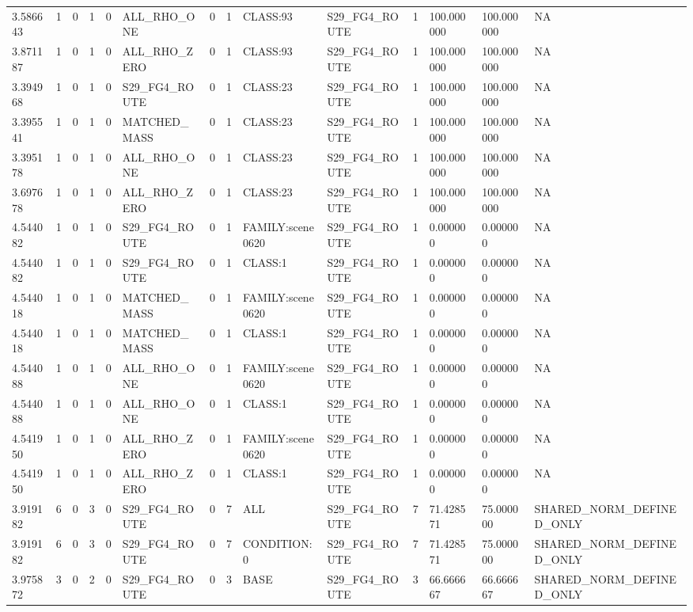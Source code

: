 \begin{tabular}{llllllllllllll}
3.586643 & 1 & 0 & 1 & 0 & ALL\_RHO\_ONE & 0 & 1 & CLASS:93 & S29\_FG4\_ROUTE & 1 & 100.000000 & 100.000000 & NA \\
3.871187 & 1 & 0 & 1 & 0 & ALL\_RHO\_ZERO & 0 & 1 & CLASS:93 & S29\_FG4\_ROUTE & 1 & 100.000000 & 100.000000 & NA \\
3.394968 & 1 & 0 & 1 & 0 & S29\_FG4\_ROUTE & 0 & 1 & CLASS:23 & S29\_FG4\_ROUTE & 1 & 100.000000 & 100.000000 & NA \\
3.395541 & 1 & 0 & 1 & 0 & MATCHED\_MASS & 0 & 1 & CLASS:23 & S29\_FG4\_ROUTE & 1 & 100.000000 & 100.000000 & NA \\
3.395178 & 1 & 0 & 1 & 0 & ALL\_RHO\_ONE & 0 & 1 & CLASS:23 & S29\_FG4\_ROUTE & 1 & 100.000000 & 100.000000 & NA \\
3.697678 & 1 & 0 & 1 & 0 & ALL\_RHO\_ZERO & 0 & 1 & CLASS:23 & S29\_FG4\_ROUTE & 1 & 100.000000 & 100.000000 & NA \\
4.544082 & 1 & 0 & 1 & 0 & S29\_FG4\_ROUTE & 0 & 1 & FAMILY:scene0620 & S29\_FG4\_ROUTE & 1 & 0.000000 & 0.000000 & NA \\
4.544082 & 1 & 0 & 1 & 0 & S29\_FG4\_ROUTE & 0 & 1 & CLASS:1 & S29\_FG4\_ROUTE & 1 & 0.000000 & 0.000000 & NA \\
4.544018 & 1 & 0 & 1 & 0 & MATCHED\_MASS & 0 & 1 & FAMILY:scene0620 & S29\_FG4\_ROUTE & 1 & 0.000000 & 0.000000 & NA \\
4.544018 & 1 & 0 & 1 & 0 & MATCHED\_MASS & 0 & 1 & CLASS:1 & S29\_FG4\_ROUTE & 1 & 0.000000 & 0.000000 & NA \\
4.544088 & 1 & 0 & 1 & 0 & ALL\_RHO\_ONE & 0 & 1 & FAMILY:scene0620 & S29\_FG4\_ROUTE & 1 & 0.000000 & 0.000000 & NA \\
4.544088 & 1 & 0 & 1 & 0 & ALL\_RHO\_ONE & 0 & 1 & CLASS:1 & S29\_FG4\_ROUTE & 1 & 0.000000 & 0.000000 & NA \\
4.541950 & 1 & 0 & 1 & 0 & ALL\_RHO\_ZERO & 0 & 1 & FAMILY:scene0620 & S29\_FG4\_ROUTE & 1 & 0.000000 & 0.000000 & NA \\
4.541950 & 1 & 0 & 1 & 0 & ALL\_RHO\_ZERO & 0 & 1 & CLASS:1 & S29\_FG4\_ROUTE & 1 & 0.000000 & 0.000000 & NA \\
3.919182 & 6 & 0 & 3 & 0 & S29\_FG4\_ROUTE & 0 & 7 & ALL & S29\_FG4\_ROUTE & 7 & 71.428571 & 75.000000 & SHARED\_NORM\_DEFINED\_ONLY \\
3.919182 & 6 & 0 & 3 & 0 & S29\_FG4\_ROUTE & 0 & 7 & CONDITION:0 & S29\_FG4\_ROUTE & 7 & 71.428571 & 75.000000 & SHARED\_NORM\_DEFINED\_ONLY \\
3.975872 & 3 & 0 & 2 & 0 & S29\_FG4\_ROUTE & 0 & 3 & BASE & S29\_FG4\_ROUTE & 3 & 66.666667 & 66.666667 & SHARED\_NORM\_DEFINED\_ONLY \\

\end{tabular}
